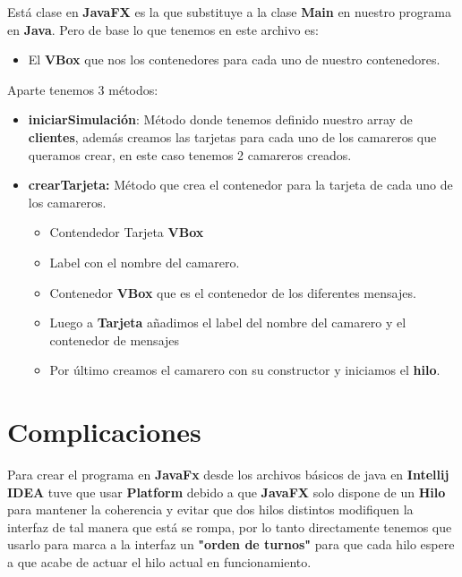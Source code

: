 \documentclass{article}
\begin{document}
Está clase en \textbf{JavaFX} es la que substituye a la clase \textbf{Main} en nuestro programa en \textbf{Java}.  Pero de base lo que tenemos en este archivo es:

\begin{itemize}
    \item El \textbf{VBox} que nos los contenedores para cada uno de nuestro contenedores.
\end{itemize}

Aparte tenemos 3 métodos:

\begin{itemize}
    \item \textbf{iniciarSimulación}:  Método donde tenemos definido nuestro array de \textbf{clientes}, además creamos las tarjetas para cada uno de los camareros que queramos crear, en este caso tenemos 2 camareros creados.
    \item \textbf{crearTarjeta:}  Método que crea el contenedor para la tarjeta de cada uno de los camareros.
    \begin{itemize}
        \item Contendedor Tarjeta \textbf{VBox}
        \item Label con el nombre del camarero.
        \item Contenedor \textbf{VBox} que es el contenedor de los diferentes mensajes.
        \item Luego a \textbf{Tarjeta} añadimos el label del nombre del camarero y el contenedor de mensajes
        \item Por último creamos el camarero con su constructor y iniciamos el \textbf{hilo}.
    \end{itemize}
\end{itemize}


\section{Complicaciones}

Para crear el programa en \textbf{JavaFx} desde los archivos básicos de java en \textbf{Intellij IDEA}  tuve que usar \textbf{Platform} debido a que \textbf{JavaFX} solo dispone de un \textbf{Hilo} para mantener la coherencia y evitar que dos hilos distintos modifiquen la interfaz de tal manera que está se rompa, por lo tanto directamente tenemos que usarlo para marca a la interfaz un \textbf{"orden de turnos"} para que cada hilo espere a que acabe de actuar el hilo actual en funcionamiento.
\end{document}

